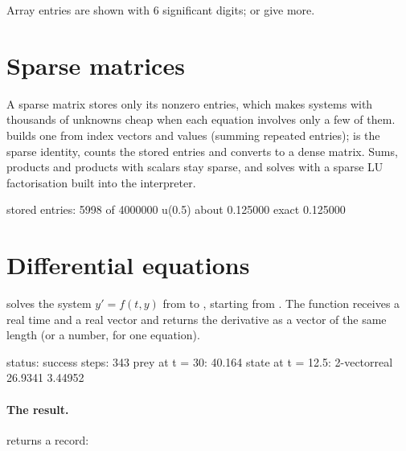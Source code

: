 \documentclass[11pt,a4paper,openany]{report}
\begin{document}
{{Array entries are shown with 6 significant digits;  or
 give more.

\section{Sparse matrices}

A sparse matrix stores only its nonzero entries, which makes systems with
thousands of unknowns cheap when each equation involves only a few of them.
 builds one from index vectors and values (summing
repeated entries);  is the sparse identity,  counts
the stored entries and  converts to a dense matrix. Sums, products
and products with scalars stay sparse, and  solves with a sparse LU
factorisation built into the interpreter.

\begin{axonout}
stored entries: 5998 of 4000000
u(0.5) about 0.125000  exact 0.125000
\end{axonout}

\section{Differential equations}\label{sec:ode}

 solves the system $y' = f(t, y)$ from
 to , starting from . The function
 receives a real time and a real vector and returns the
derivative as a vector of the same length (or a number, for one equation).

\begin{axonout}
status: success  steps: 343
prey at t = 30: 40.164
state at t = 12.5: 2-vector{real}
  26.9341
  3.44952
\end{axonout}


\paragraph{The result.}  returns a record:

}}
\end{document}
